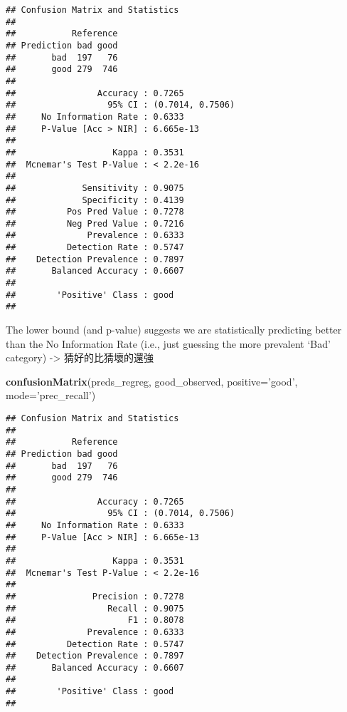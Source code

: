 \documentclass[]{book}
\newenvironment{Shaded}{\begin{snugshade}}{\end{snugshade}}
\newcommand{\KeywordTok}[1]{\textcolor[rgb]{0.13,0.29,0.53}{\textbf{#1}}}
\newcommand{\DataTypeTok}[1]{\textcolor[rgb]{0.13,0.29,0.53}{#1}}
\newcommand{\StringTok}[1]{\textcolor[rgb]{0.31,0.60,0.02}{#1}}
\newcommand{\NormalTok}[1]{#1}
\begin{document}
\begin{verbatim}
## Confusion Matrix and Statistics
## 
##           Reference
## Prediction bad good
##       bad  197   76
##       good 279  746
##                                           
##                Accuracy : 0.7265          
##                  95% CI : (0.7014, 0.7506)
##     No Information Rate : 0.6333          
##     P-Value [Acc > NIR] : 6.665e-13       
##                                           
##                   Kappa : 0.3531          
##  Mcnemar's Test P-Value : < 2.2e-16       
##                                           
##             Sensitivity : 0.9075          
##             Specificity : 0.4139          
##          Pos Pred Value : 0.7278          
##          Neg Pred Value : 0.7216          
##              Prevalence : 0.6333          
##          Detection Rate : 0.5747          
##    Detection Prevalence : 0.7897          
##       Balanced Accuracy : 0.6607          
##                                           
##        'Positive' Class : good            
## 
\end{verbatim}

The lower bound (and p-value) suggests we are statistically predicting better than the No Information Rate (i.e., just guessing the more prevalent `Bad' category) -\textgreater{} 猜好的比猜壞的還強

\begin{Shaded}
\begin{Highlighting}[]
\KeywordTok{confusionMatrix}\NormalTok{(preds_regreg, good_observed, }\DataTypeTok{positive=}\StringTok{'good'}\NormalTok{, }\DataTypeTok{mode=}\StringTok{'prec_recall'}\NormalTok{)}
\end{Highlighting}
\end{Shaded}

\begin{verbatim}
## Confusion Matrix and Statistics
## 
##           Reference
## Prediction bad good
##       bad  197   76
##       good 279  746
##                                           
##                Accuracy : 0.7265          
##                  95% CI : (0.7014, 0.7506)
##     No Information Rate : 0.6333          
##     P-Value [Acc > NIR] : 6.665e-13       
##                                           
##                   Kappa : 0.3531          
##  Mcnemar's Test P-Value : < 2.2e-16       
##                                           
##               Precision : 0.7278          
##                  Recall : 0.9075          
##                      F1 : 0.8078          
##              Prevalence : 0.6333          
##          Detection Rate : 0.5747          
##    Detection Prevalence : 0.7897          
##       Balanced Accuracy : 0.6607          
##                                           
##        'Positive' Class : good            
## 
\end{verbatim}
\end{document}
